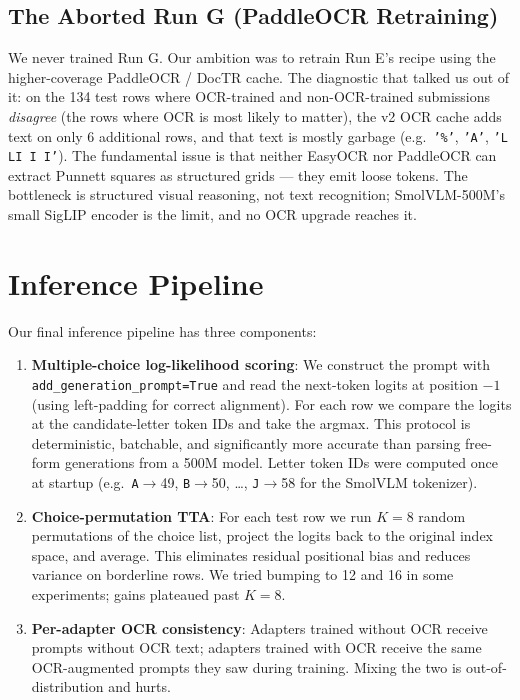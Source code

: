 \documentclass[11pt]{article}
\begin{document}
\subsection{The Aborted Run G (PaddleOCR Retraining)}
We never trained Run G. Our ambition was to retrain Run E's recipe using the higher-coverage PaddleOCR / DocTR cache. The diagnostic that talked us out of it: on the 134 test rows where OCR-trained and non-OCR-trained submissions \emph{disagree} (the rows where OCR is most likely to matter), the v2 OCR cache adds text on only 6 additional rows, and that text is mostly garbage (e.g.\ \texttt{'\%'}, \texttt{'A'}, \texttt{'L LI I I'}). The fundamental issue is that neither EasyOCR nor PaddleOCR can extract Punnett squares as structured grids --- they emit loose tokens. The bottleneck is structured visual reasoning, not text recognition; SmolVLM-500M's small SigLIP encoder is the limit, and no OCR upgrade reaches it.

\section{Inference Pipeline}

Our final inference pipeline has three components:

\begin{enumerate}
    \item \textbf{Multiple-choice log-likelihood scoring}: We construct the prompt with \texttt{add\_generation\_prompt=True} and read the next-token logits at position $-1$ (using left-padding for correct alignment). For each row we compare the logits at the candidate-letter token IDs and take the argmax. This protocol is deterministic, batchable, and significantly more accurate than parsing free-form generations from a 500M model. Letter token IDs were computed once at startup (e.g.\ \texttt{A}$\to$49, \texttt{B}$\to$50, \dots, \texttt{J}$\to$58 for the SmolVLM tokenizer).
    \item \textbf{Choice-permutation TTA}: For each test row we run $K{=}8$ random permutations of the choice list, project the logits back to the original index space, and average. This eliminates residual positional bias and reduces variance on borderline rows. We tried bumping to 12 and 16 in some experiments; gains plateaued past $K{=}8$.
    \item \textbf{Per-adapter OCR consistency}: Adapters trained without OCR receive prompts without OCR text; adapters trained with OCR receive the same OCR-augmented prompts they saw during training. Mixing the two is out-of-distribution and hurts.
\end{enumerate}
\end{document}
